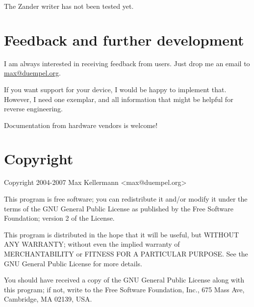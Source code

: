 \documentclass{article}
\begin{document}
The Zander writer has not been tested yet.


\section{Feedback and further development}

I am always interested in receiving feedback from users.  Just drop me
an email to \href{mailto:max@duempel.org}{max@duempel.org}.

If you want support for your device, I would be happy to implement
that.  However, I need one exemplar, and all information that might be
helpful for reverse engineering.

Documentation from hardware vendors is welcome!


\section{Copyright}

Copyright 2004-2007 Max Kellermann <max@duempel.org>

This program is free software; you can redistribute it and/or modify
it under the terms of the GNU General Public License as published by
the Free Software Foundation; version 2 of the License.

This program is distributed in the hope that it will be useful, but
WITHOUT ANY WARRANTY; without even the implied warranty of
MERCHANTABILITY or FITNESS FOR A PARTICULAR PURPOSE.  See the GNU
General Public License for more details.

You should have received a copy of the GNU General Public License
along with this program; if not, write to the Free Software
Foundation, Inc., 675 Mass Ave, Cambridge, MA 02139, USA.
\end{document}
